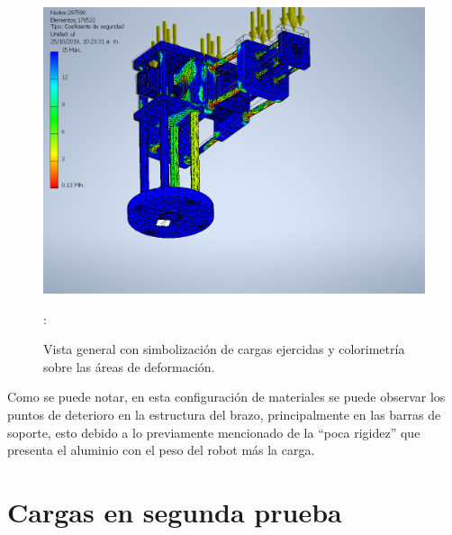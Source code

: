 \documentclass[11pt,a4paper,oldfontcommands,oneside]{memoir}
\begin{document}
\begin{flushleft}
\begin{figure}
\begin{center}
\includegraphics[scale=.55]{ca3.png}
\end{center}
\caption{Vista general con simbolización de cargas ejercidas y colorimetría sobre las áreas de deformación.}
\label{tabla11}:
\end{figure}

Como se puede notar, en esta configuración de materiales se puede observar los puntos de deterioro en la estructura del brazo, principalmente en las barras de soporte, esto debido a lo previamente mencionado de la “poca rigidez” que presenta el aluminio con el peso del robot más la carga.

\end{flushleft}

\chapter{Cargas en segunda prueba}
\end{document}

